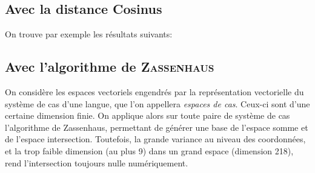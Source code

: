 \documentclass{cours}
\newcommand{\codedir}{Morphosyntactic-Categories_Code}
\begin{document}
    \subsection{Avec la distance Cosinus}
    On trouve par exemple les résultats suivants:

    

    

    

    

    

    

    

    \subsection{Avec l'algorithme de \textsc{Zassenhaus}}
    On considère les espaces vectoriels engendrés par la représentation vectorielle du système de cas d'une langue, que l'on appellera \textit{espaces de cas}.
    Ceux-ci sont d'une certaine dimension finie.
    On applique alors sur toute paire de système de cas l'algorithme de Zassenhaus, permettant de générer une base de l'espace somme et de l'espace intersection.
    Toutefois, la grande variance au niveau des coordonnées, et la trop faible dimension (au plus 9) dans un grand espace (dimension 218), rend l'intersection toujours nulle numériquement.
\end{document}
